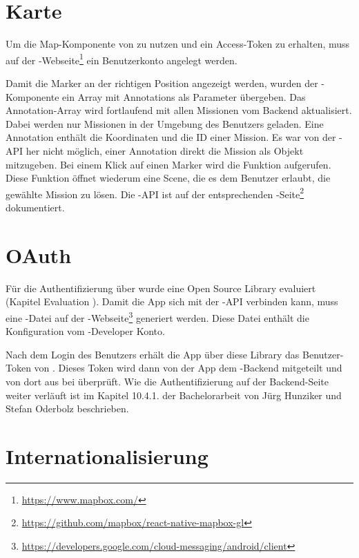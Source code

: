 \section{Karte}
Um die Map-Komponente von  zu nutzen und ein Access-Token zu erhalten, muss auf der -Webseite\footnote{\url{https://www.mapbox.com/}} ein Benutzerkonto angelegt werden. 

Damit die Marker an der richtigen Position angezeigt werden, wurden der -Komponente ein Array mit Annotations als Parameter übergeben. 
Das Annotation-Array wird fortlaufend mit allen Missionen vom \gls{Backend} aktualisiert. 
Dabei werden nur Missionen in der Umgebung des Benutzers geladen. 
Eine Annotation enthält die Koordinaten und die ID einer Mission. 
Es war von der -\gls{API} her nicht möglich, einer Annotation direkt die Mission als Objekt mitzugeben. 
Bei einem Klick auf einen Marker wird die Funktion  aufgerufen.
Diese Funktion öffnet wiederum eine Scene, die es dem Benutzer erlaubt, die gewählte Mission zu lösen.
Die -\gls{API} ist auf der entsprechenden -Seite\footnote{\url{https://github.com/mapbox/react-native-mapbox-gl}} dokumentiert. 


\section{OAuth}
Für die Authentifizierung über  wurde eine Open Source \gls{Library} evaluiert (Kapitel Evaluation ). 
Damit die App sich mit der -\gls{API} verbinden kann, muss eine -Datei auf der -Webseite\footnote{\url{https://developers.google.com/cloud-messaging/android/client}} generiert werden. 
Diese Datei enthält die Konfiguration vom -Developer Konto. 

Nach dem Login des Benutzers erhält die App über diese \gls{Library} das Benutzer-Token von .
Dieses Token wird dann von der App dem \kort{}-\gls{Backend} mitgeteilt und von dort aus bei  überprüft. 
Wie die Authentifizierung auf der \gls{Backend}-Seite weiter verläuft ist im Kapitel 10.4.1. der Bachelorarbeit von Jürg Hunziker und Stefan Oderbolz beschrieben.\cite{ba-kort-2012}


\section{Internationalisierung}

